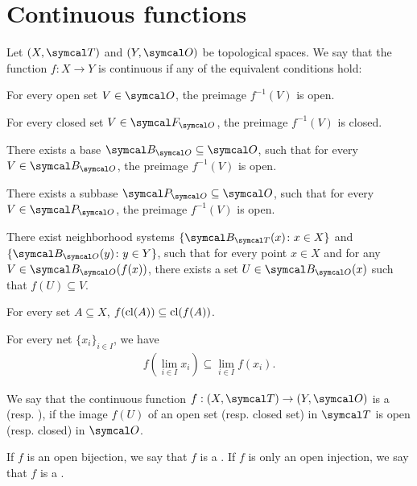 \section{Continuous functions}\label{sec:continuous_functions}

\begin{definition}\label{def:continuous_function}
  Let $(X, \Cal{T})$ and $(Y, \Cal{O})$ be topological spaces. We say that the function $f: X \to Y$ is continuous if any of the equivalent conditions hold:
  \begin{defenum}
    \item\label{def:continuous_function/direct} For every open set $V \in \Cal{O}$, the preimage $f^{-1}(V)$ is open.
    \item\label{def:continuous_function/closed} For every closed set $V \in \Cal{F}_{\Cal{O}}$, the preimage $f^{-1}(V)$ is closed.
    \item\label{def:continuous_function/base} There exists a base $\Cal{B}_{\Cal{O}} \subseteq \Cal{O}$, such that for every $V \in \Cal{B}_{\Cal{O}}$, the preimage $f^{-1}(V)$ is open.
    \item\label{def:continuous_function/subbase} There exists a subbase $\Cal{P}_{\Cal{O}} \subseteq \Cal{O}$, such that for every $V \in \Cal{P}_{\Cal{O}}$, the preimage $f^{-1}(V)$ is open.
    \item\label{def:continuous_function/local_base} There exist neighborhood systems $\{ \Cal{B}_{\Cal{T}}(x) \colon x \in X \}$ and $\{ \Cal{B}_{\Cal{O}}(y) \colon y \in Y \}$, such that for every point $x \in X$ and for any $V \in \Cal{B}_{\Cal{O}}(f(x))$, there exists a set $U \in \Cal{B}_{\Cal{O}}(x)$ such that $f(U) \subseteq V$.
    \item\label{def:continuous_function/closure} For every set $A \subseteq X$, $f(\operatorname{cl}(A)) \subseteq \operatorname{cl}(f(A))$.
    \item\label{def:continuous_function/limits} For every net $\{ x_i \}_{i \in I}$, we have
    \begin{align*}
      f\left(\lim_{i \in I} x_i \right) \subseteq \lim_{i \in I} f(x_i).
    \end{align*}
  \end{defenum}
\end{definition}

\begin{definition}\label{def:homeomorphism}
  We say that the continuous function $f: (X, \Cal{T}) \to (Y, \Cal{O})$ is a  (resp. ), if the image $f(U)$ of an open set (resp. closed set) in $\Cal{T}$ is open (resp. closed) in $\Cal{O}$.

  If $f$ is an open bijection, we say that $f$ is a . If $f$ is only an open injection, we say that $f$ is a .
\end{definition}
